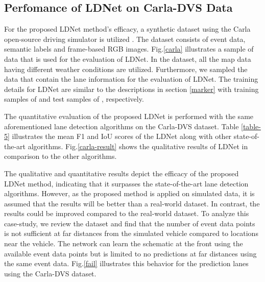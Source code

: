 \documentclass[journal]{IEEEtran}
\begin{document}
\subsection{Perfomance of LDNet on Carla-DVS Data}
For the proposed LDNet method's efficacy, a synthetic dataset using the Carla open-source driving simulator is utilized \cite{evd}. The dataset consists of event data, semantic labels and frame-based RGB images. Fig.\ref{carla} illustrates a sample of data that is used for the evaluation of LDNet. In the dataset, all the map data having different weather conditions are utilized. Furthermore, we sampled the data that contain the lane information for the evaluation of LDNet. The training details for LDNet are similar to the descriptions in section \ref{marker} with training samples of  and test samples of , respectively.
\par 
The quantitative evaluation of the proposed LDNet is performed with the same aforementioned lane detection algorithms on the Carla-DVS dataset. Table \ref{table-5} illustrates the mean F1 and IoU scores of the LDNet along with other state-of-the-art algorithms. Fig.\ref{carla-result} shows the qualitative results of LDNet in comparison to the other algorithms.
\par
The qualitative and quantitative results depict the efficacy of the proposed LDNet method, indicating that it surpasses the state-of-the-art lane detection algorithms. However, as the proposed method is applied on simulated data, it is assumed that the results will be better than a real-world dataset. In contrast, the results could be improved compared to the real-world dataset. To analyze this case-study, we review the dataset and find that the number of event data points is not sufficient at far distances from the simulated vehicle compared to locations near the vehicle. The network can learn the schematic at the front using the available event data points but is limited to no predictions at far distances using the same event data. Fig.\ref{fail} illustrates this behavior for the prediction lanes using the Carla-DVS dataset.
\end{document}
